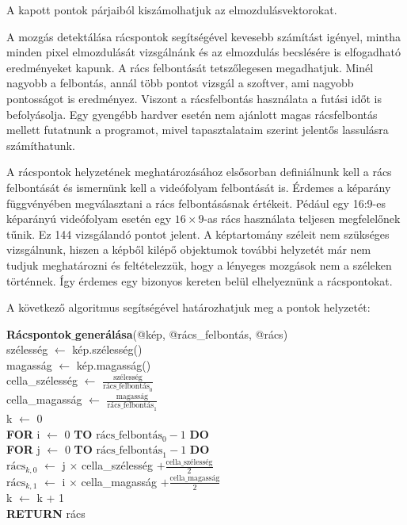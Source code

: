 A kapott pontok párjaiból kiszámolhatjuk az elmozdulásvektorokat.

A mozgás detektálása rácspontok segítségével kevesebb számítást igényel, mintha minden pixel elmozdulását vizsgálnánk és az elmozdulás becslésére is elfogadható eredményeket kapunk.
A rács felbontását tetszőlegesen megadhatjuk. Minél nagyobb a felbontás, annál több pontot vizsgál a szoftver, ami nagyobb pontosságot is eredményez. Viszont a rácsfelbontás használata a futási időt is befolyásolja. Egy gyengébb hardver esetén nem ajánlott magas rácsfelbontás mellett futatnunk a programot, mivel tapasztalataim szerint jelentős lassulásra számíthatunk.

A rácspontok helyzetének meghatározásához elsősorban definiálnunk kell a rács felbontását és ismernünk kell a videófolyam felbontását is. Érdemes a képarány függvényében megválasztani a rács felbontásásnak értékeit. Pédául egy 16:9-es képarányú videófolyam esetén egy $16 \times 9$-as rács használata teljesen megfelelőnek tűnik. Ez 144 vizsgálandó pontot jelent.
A képtartomány széleit nem szükséges vizsgálnunk, hiszen a képből kilépő objektumok további helyzetét már nem tudjuk meghatározni és feltételezzük, hogy a lényeges mozgások nem a széleken történnek. Így érdemes egy bizonyos kereten belül elhelyeznünk a rácspontokat.

\bigskip

\noindent A következő algoritmus segítségével határozhatjuk meg a pontok helyzetét:

\medskip

\noindent \textbf{Rácspontok$\_$generálása}(@kép, @rács\_felbontás, @rács)\\
szélesség $\leftarrow$ kép.szélesség()\\
magasság $\leftarrow$  kép.magasság()\\
cella\_szélesség $\leftarrow$ $\frac{\text{szélesség}}{\text{rács\_felbontás}_0}$\\
cella\_magasság $\leftarrow$ $\frac{\text{magasság}}{\text{rács\_felbontás}_1}$\\
k $\leftarrow$ 0\\
\textbf{FOR} i $\leftarrow$ 0 \textbf{TO} $\text{rács\_felbontás}_0-1$ \textbf{DO}\\
\indent \textbf{FOR} j $\leftarrow$ 0 \textbf{TO} $\text{rács\_felbontás}_1-1$ \textbf{DO}\\
\indent \indent $\text{rács}_{k,0}$ $\leftarrow$ j $\times$ cella\_szélesség $+ \frac{\text{cella\_szélesség}}{2}$\\
\indent \indent $\text{rács}_{k,1}$ $\leftarrow$ i $\times$ cella\_magasság $+ \frac{\text{cella\_magasság}}{2}$\\
\indent \indent k $\leftarrow$ k + 1\\
\textbf{RETURN} rács

